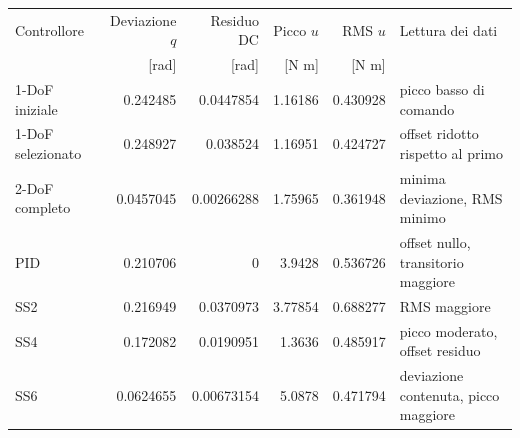 \begin{tabular}{lrrrrp{3.1cm}}\toprule
Controllore & Deviazione $q$ & Residuo DC & Picco $u$ & RMS $u$ & Lettura dei dati\\
 & [rad] & [rad] & [N m] & [N m] & \\\midrule
1-DoF iniziale & 0.242485 & 0.0447854 & 1.16186 & 0.430928 & picco basso di comando \\
1-DoF selezionato & 0.248927 & 0.038524 & 1.16951 & 0.424727 & offset ridotto rispetto al primo \\
2-DoF completo & 0.0457045 & 0.00266288 & 1.75965 & 0.361948 & minima deviazione, RMS minimo \\
PID & 0.210706 & 0 & 3.9428 & 0.536726 & offset nullo, transitorio maggiore \\
SS2 & 0.216949 & 0.0370973 & 3.77854 & 0.688277 & RMS maggiore \\
SS4 & 0.172082 & 0.0190951 & 1.3636 & 0.485917 & picco moderato, offset residuo \\
SS6 & 0.0624655 & 0.00673154 & 5.0878 & 0.471794 & deviazione contenuta, picco maggiore \\
\bottomrule\end{tabular}
